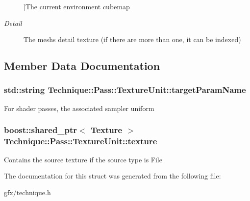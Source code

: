 \begin{Desc}
\begin{description}
{}]The current environment cubemap \item[{\em 
Detail\hypertarget{structTechnique_1_1Pass_1_1TextureUnit_a271709bfd3d90a60bf2bb1ab5099c172a66f1789c81c6ad00cc4ff74d3a83e713}{}\label{structTechnique_1_1Pass_1_1TextureUnit_a271709bfd3d90a60bf2bb1ab5099c172a66f1789c81c6ad00cc4ff74d3a83e713}
}]The mesh\textquotesingle{}s detail texture (if there are more than one, it can be indexed) \end{description}
\end{Desc}


\subsection{Member Data Documentation}
\subsubsection[{\texorpdfstring{target\+Param\+Name}{targetParamName}}]{\setlength{\rightskip}{0pt plus 5cm}std\+::string Technique\+::\+Pass\+::\+Texture\+Unit\+::target\+Param\+Name}\hypertarget{structTechnique_1_1Pass_1_1TextureUnit_af9e958f78951c8c23fdf4a0447d05f2e}{}\label{structTechnique_1_1Pass_1_1TextureUnit_af9e958f78951c8c23fdf4a0447d05f2e}
For shader passes, the associated sampler uniform 
\subsubsection[{\texorpdfstring{texture}{texture}}]{\setlength{\rightskip}{0pt plus 5cm}boost\+::shared\+\_\+ptr$<$ {\bf Texture} $>$ Technique\+::\+Pass\+::\+Texture\+Unit\+::texture}\hypertarget{structTechnique_1_1Pass_1_1TextureUnit_a0b49e23c5d11320ca2bda98909c2259d}{}\label{structTechnique_1_1Pass_1_1TextureUnit_a0b49e23c5d11320ca2bda98909c2259d}
Contains the source texture if the source type is File 

The documentation for this struct was generated from the following file\+:\begin{DoxyCompactItemize}
\item 
gfx/technique.\+h\end{DoxyCompactItemize}
